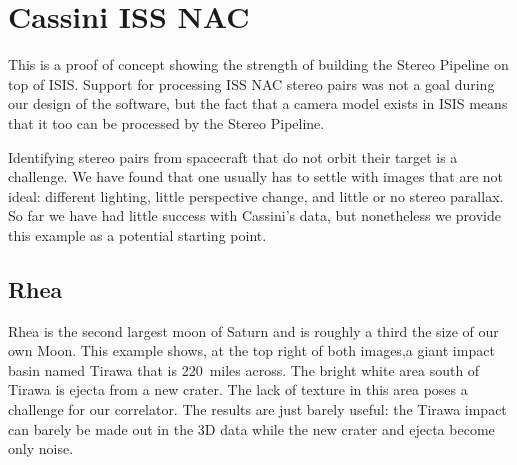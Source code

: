 \section{Cassini ISS NAC}

This is a proof of concept showing the strength of building the Stereo
Pipeline on top of \ac{ISIS}.  Support for processing ISS NAC stereo pairs
was not a goal during our design of the software, but the fact that a
camera model exists in \ac{ISIS} means that it too can be processed by the
Stereo Pipeline.

Identifying stereo pairs from spacecraft that do not orbit their
target is a challenge. We have found that one usually has to settle
with images that are not ideal: different lighting, little perspective
change, and little or no stereo parallax. So far we have had little
success with Cassini's data, but nonetheless we provide this example
as a potential starting point.

\subsection{Rhea}

Rhea is the second largest moon of Saturn and is roughly a third the
size of our own Moon. This example shows, at the top right of both
images,a giant impact basin named Tirawa that is 220~miles across. The
bright white area south of Tirawa is ejecta from a new crater.  The
lack of texture in this area poses a challenge for our correlator. The
results are just barely useful: the Tirawa impact can barely be made
out in the 3D data while the new crater and ejecta become only noise.

